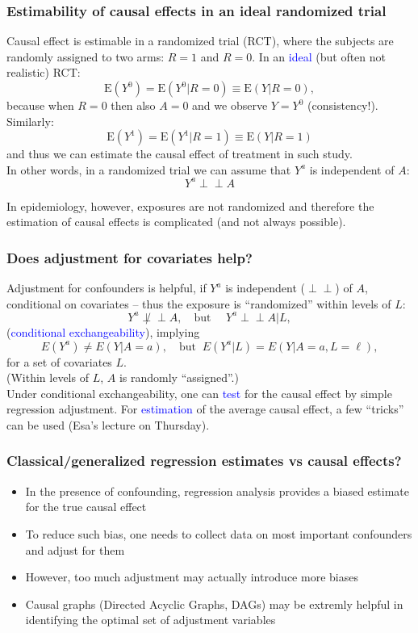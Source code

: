 \documentclass[10pt,dvipsnames,t,handout%
,aspectratio=169%
]{beamer}%
\newcommand{\E}{\mathrm{E}}
\newcommand{\indep}{\perp\!\!\!\!\perp}
\newcommand{\sini}[1]{\textcolor{Blue}{#1}}
\newcommand{\puna}[1]{\textcolor{BrickRed}{#1}}
\begin{document}
\begin{frame}
	\frametitle{Estimability of causal effects in an ideal randomized trial}
	Causal effect is estimable in a \puna{randomized trial (RCT)}, where the subjects are randomly assigned to two arms: 
	$R=1$ and $R=0$. In an \sini{ideal} (but often not realistic) RCT: 
		$$\E(Y^0) = \E(Y^0|R=0) \equiv \E(Y|R=0),$$
	because when $R=0$ then also $A=0$ and we observe $Y=Y^0$ (consistency!). \\  
	Similarly: 
	$$\E(Y^1) = \E(Y^1|R=1) \equiv \E(Y|R=1)$$ 
	and thus we can estimate the causal effect of treatment in such study. \\[2mm]
	In other words, in a randomized trial we can assume that $Y^a$ is independent of $A$: 
$$Y^a \indep A$$
	\begin{block}{}	
		In epidemiology, however, exposures are not randomized and therefore 
		the estimation of causal effects is complicated (and not always possible).
	\end{block}
\end{frame}


\begin{frame}
	\frametitle{Does adjustment for covariates help?}
	Adjustment for confounders is helpful, if $Y^a$ is independent ($\indep$) of $A$, conditional on covariates -- 
	thus the exposure is ``randomized'' within levels of $L$:
	$$Y^a \not\indep A, \quad  \text{but } \quad Y^a \indep A | L,$$ (\sini{conditional exchangeability}), implying 
	$$E(Y^a) \ne E(Y|A=a), \quad \text{but } \
	E(Y^a|L) = E(Y|A=a, L=\ell),$$
	for a set of covariates $L$. \\
	(Within levels of $L$, $A$ is randomly ``assigned''.)\\[5mm]
	Under conditional exchangeability, one can \sini{test} for the causal effect by simple regression adjustment. 
	For \sini{estimation} of the average causal effect, a few ``tricks'' can be used (Esa's lecture on Thursday). 
\end{frame}


\begin{frame}
 \frametitle{Classical/generalized regression estimates vs  causal effects?}
 \begin{itemize}
 \item In the presence of confounding, regression analysis provides a biased estimate for the true causal effect
\item To reduce such bias, one needs to collect data on most important confounders and adjust for them
\item However, too much adjustment may actually introduce more biases   
\item Causal graphs (Directed Acyclic Graphs, DAGs) may be extremly helpful in identifying the optimal set of adjustment variables
\end{itemize}
 \end{frame}
\end{document}
